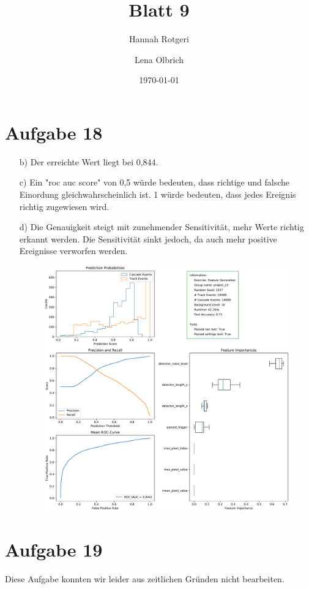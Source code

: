 \documentclass[11pt,a4paper]{article}
\title{Blatt 9}
\date{\today}
\author{Hannah Rotgeri \and Lena Olbrich}
\begin{document}
	\maketitle
	
	\section{Aufgabe 18}


	\begin{itemize}
		\item[b)] 
			Der erreichte Wert liegt bei 0,844.
		
		\item[c)]
			 Ein "roc auc score" von 0,5 würde bedeuten, dass richtige und falsche Einordung gleichwahrscheinlich ist.
			 1 würde bedeuten, dass jedes Ereignis richtig zugewiesen wird.

		\item[d)]
			 Die Genauigkeit steigt mit zunehmender Sensitivität,
			 mehr Werte richtig erkannt werden.
			 Die Sensitivität sinkt jedoch, da auch mehr positive Ereignisse verworfen werden.
		   
			\begin{figure}[H]
				\centering
				\includegraphics[width=\textwidth]{feature_generation.pdf}
			\end{figure} 

	\end{itemize}

	\section{Aufgabe 19}
	Diese Aufgabe konnten wir leider aus zeitlichen Gründen nicht bearbeiten.
\end{document}
